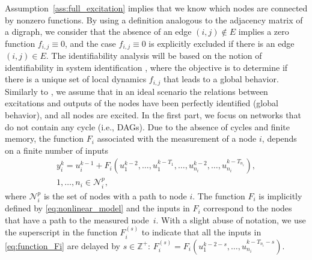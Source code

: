 \documentclass[letterpaper,10pt,journal]{IEEEtran}
\newcommand{\NN}{\mathcal{N}}
\begin{document}
Assumption~\ref{ass:full_excitation} implies that we know which nodes are connected by nonzero functions. By using a definition analogous to the adjacency matrix of a digraph, we consider that the absence of an edge $(i,j)\not\in E$ implies a zero function $f_{i,j}\equiv 0$, and the case $f_{i,j}\equiv 0$ is explicitly excluded if there is an edge $(i,j)\in E$. The identifiability analysis will be based on the notion of identifiability in system identification \cite{ljung1999system}, where the objective is to determine if there is a unique set of local dynamics $f_{i,j}$ that leads to a global behavior. Similarly to \cite{hendrickx2019identifiability,legat2020local,legat2021path}, we assume that in an ideal scenario the relations between excitations and outputs of the nodes have been perfectly identified (global behavior), and all nodes are excited. In the first part, we focus on networks that do not contain any cycle (i.e., DAGs). Due to the absence of cycles and finite memory, the function $F_i$ associated with the measurement of a node $i$, depends on a finite number of inputs
\begin{multline}\label{eq:function_Fi}
    y_i^k=u_i^{k-1}+F_i(u_1^{k-2},\ldots,u_1^{k-T_1},\ldots,u_{n_i}^{k-2},\ldots,u_{n_i}^{k-T_{n_i}}),\\
    1,\dots,n_i\in \mathcal{N}_i^p,
\end{multline}
where $\NN_i^p$ is the set of nodes with a path to node $i$. The function $F_i$ is implicitly defined by \eqref{eq:nonlinear_model} and the inputs in $F_i$ correspond to the nodes that have a path to the measured node~$i$. With a slight abuse of notation, we use the superscript in the function $F_i^{(s)}$ to indicate that all the inputs in \eqref{eq:function_Fi} are delayed by $s\in \mathbb{Z}^+$: $F_i^{(s)}=F_i(u_1^{k-2-s},\ldots,u_{n_i}^{k-T_{n_i}-s})$. 
\end{document}
